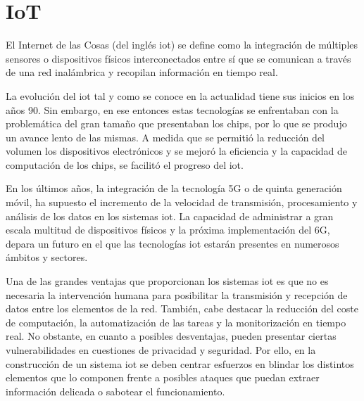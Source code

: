 \section{IoT}
\label{sec:iot}

El Internet de las Cosas (del inglés \gls{iot}) \cite{iot} \cite{iotamazon} se define como la integración de múltiples sensores o dispositivos físicos interconectados entre sí que se comunican a través de una red inalámbrica y recopilan información en tiempo real. 

\vspace{3mm}

La evolución del \gls{iot} tal y como se conoce en la actualidad tiene sus inicios en los años 90. Sin embargo, en ese entonces estas tecnologías se enfrentaban con la problemática del gran tamaño que presentaban los chips, por lo que se produjo un avance lento de las mismas. A medida que se permitió la reducción del volumen los dispositivos electrónicos y se mejoró la eficiencia y la capacidad de computación de los chips, se facilitó el progreso del \gls{iot}.

\vspace{3mm}

En los últimos años, la integración de la tecnología 5G o de quinta generación móvil, ha supuesto el incremento de la velocidad de transmisión, procesamiento y análisis de los datos en los sistemas \gls{iot}. La capacidad de administrar a gran escala multitud de dispositivos físicos y la próxima implementación del 6G, depara un futuro en el que las tecnologías \gls{iot} estarán presentes en numerosos ámbitos y sectores.

\vspace{3mm}

Una de las grandes ventajas que proporcionan los sistemas \gls{iot} es que no es necesaria la intervención humana para posibilitar la transmisión y recepción de datos entre los elementos de la red. También, cabe destacar la reducción del coste de computación, la automatización de las tareas y la monitorización en tiempo real. No obstante, en cuanto a posibles desventajas, pueden presentar ciertas vulnerabilidades en cuestiones de privacidad y seguridad. Por ello, en la construcción de un sistema \gls{iot} se deben centrar esfuerzos en blindar los distintos elementos que lo componen frente a posibles ataques que puedan extraer información delicada o sabotear el funcionamiento. 

\vspace{3mm}

